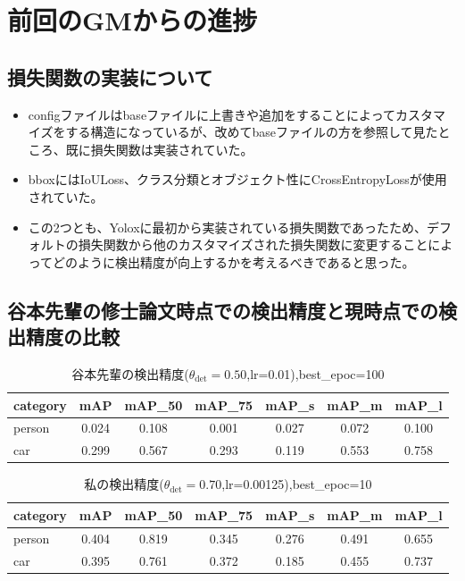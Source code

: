\documentclass[a4j]{jarticle}
\begin{document}
	\section{前回のGMからの進捗}
	\subsection{損失関数の実装について}
	\begin{itemize}
		\item configファイルはbaseファイルに上書きや追加をすることによってカスタマイズをする構造になっているが、改めてbaseファイルの方を参照して見たところ、既に損失関数は実装されていた。
		\item bboxにはIoULoss、クラス分類とオブジェクト性にCrossEntropyLossが使用されていた。
		\item この2つとも、Yoloxに最初から実装されている損失関数であったため、デフォルトの損失関数から他のカスタマイズされた損失関数に変更することによってどのように検出精度が向上するかを考えるべきであると思った。
	\end{itemize}
	\subsection{谷本先輩の修士論文時点での検出精度と現時点での検出精度の比較}
	\begin{table}[htbp]
	\centering
	\caption{谷本先輩の検出精度($\theta_{\mathrm{det}}=0.50$,lr=0.01),best\_epoc=100}
		\begin{tabular}{lcccccc}
			\hline
			\textbf{category} & \textbf{mAP} & \textbf{mAP\_50} & \textbf{mAP\_75} & \textbf{mAP\_s} & \textbf{mAP\_m} & \textbf{mAP\_l} \\
			\hline
			person & 0.024 & 0.108 & 0.001 & 0.027 & 0.072 & 0.100 \\
			car    & 0.299 & 0.567 & 0.293 & 0.119 & 0.553 & 0.758 \\
			\hline
		\end{tabular}
	\end{table}

	\begin{table}[htbp]
	\centering
	\caption{私の検出精度($\theta_{\mathrm{det}}=0.70$,lr=0.00125),best\_epoc=10}
		\begin{tabular}{lcccccc}
			\hline
			\textbf{category} & \textbf{mAP} & \textbf{mAP\_50} & \textbf{mAP\_75} & \textbf{mAP\_s} & \textbf{mAP\_m} & \textbf{mAP\_l} \\
			\hline
			person & 0.404 & 0.819 & 0.345 & 0.276 & 0.491 & 0.655 \\
			car    & 0.395 & 0.761 & 0.372 & 0.185 & 0.455 & 0.737 \\
			\hline
		\end{tabular}
	\end{table}
\end{document}
